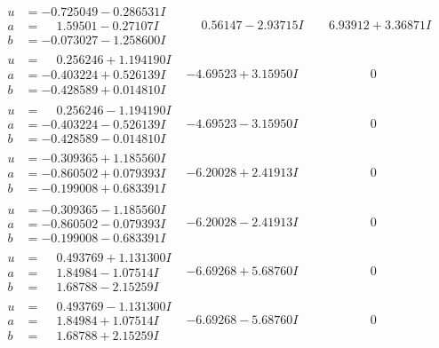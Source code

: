 \documentclass[1p]{elsarticle_modified}
\theoremstyle{definition}
\begin{document}
$$\begin{array}{c|c|c}
\begin{aligned}
u &= -0.725049 - 0.286531 I \\
a &= \phantom{-}1.59501 - 0.27107 I \\
b &= -0.073027 - 1.258600 I\end{aligned}
 & \phantom{-}0.56147 - 2.93715 I & \phantom{-}6.93912 + 3.36871 I \\ \hline\begin{aligned}
u &= \phantom{-}0.256246 + 1.194190 I \\
a &= -0.403224 + 0.526139 I \\
b &= -0.428589 + 0.014810 I\end{aligned}
 & -4.69523 + 3.15950 I & \phantom{-0.000000 } 0 \\ \hline\begin{aligned}
u &= \phantom{-}0.256246 - 1.194190 I \\
a &= -0.403224 - 0.526139 I \\
b &= -0.428589 - 0.014810 I\end{aligned}
 & -4.69523 - 3.15950 I & \phantom{-0.000000 } 0 \\ \hline\begin{aligned}
u &= -0.309365 + 1.185560 I \\
a &= -0.860502 + 0.079393 I \\
b &= -0.199008 + 0.683391 I\end{aligned}
 & -6.20028 + 2.41913 I & \phantom{-0.000000 } 0 \\ \hline\begin{aligned}
u &= -0.309365 - 1.185560 I \\
a &= -0.860502 - 0.079393 I \\
b &= -0.199008 - 0.683391 I\end{aligned}
 & -6.20028 - 2.41913 I & \phantom{-0.000000 } 0 \\ \hline\begin{aligned}
u &= \phantom{-}0.493769 + 1.131300 I \\
a &= \phantom{-}1.84984 - 1.07514 I \\
b &= \phantom{-}1.68788 - 2.15259 I\end{aligned}
 & -6.69268 + 5.68760 I & \phantom{-0.000000 } 0 \\ \hline\begin{aligned}
u &= \phantom{-}0.493769 - 1.131300 I \\
a &= \phantom{-}1.84984 + 1.07514 I \\
b &= \phantom{-}1.68788 + 2.15259 I\end{aligned}
 & -6.69268 - 5.68760 I & \phantom{-0.000000 } 0 \\ \hline\begin{aligned}

\end{aligned}
\end{array}$$
\end{document}
